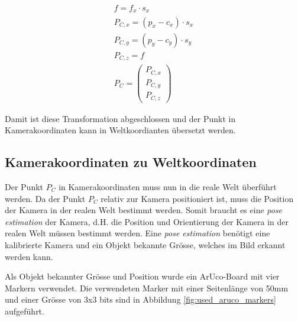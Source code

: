 \begin{align}
f = f_x \cdot s_x\\
P_{C,x} = (p_x - c_x) \cdot s_x\\
P_{C,y} = (p_y - c_y) \cdot s_y\\
P_{C,z} = f\\
P_C = \begin{pmatrix}P_{C,x}\\P_{C,y}\\P_{C,z}\end{pmatrix}
\end{align}


Damit ist diese Transformation abgeschlossen und der Punkt in Kamerakoordinaten kann in Weltkoordianten übersetzt werden.

\subsection{Kamerakoordinaten zu Weltkoordinaten}\label{kap:camera_to_world}

Der Punkt $P_C$ in Kamerakoordinaten muss nun in die reale Welt überführt werden. Da der Punkt $P_C$ relativ zur Kamera
positioniert ist, muss die Position der Kamera in der realen Welt bestimmt werden.
Somit braucht es eine \emph{pose estimation} der Kamera, d.H. die Position und Orientierung der Kamera in der realen Welt müssen bestimmt werden.
Eine \emph{pose estimation} benötigt eine kalibrierte Kamera und ein Objekt bekannte Grösse, welches im Bild erkannt werden kann.

Als Objekt bekannter Grösse und Position wurde ein ArUco-Board \cite{opencv:detection_of_aruco_boards} mit vier Markern verwendet.
Die verwendeten Marker mit einer Seitenlänge von 50\si{\milli\metre} und einer Grösse von 3x3 bits sind
in Abbildung \ref{fig:used_aruco_markers} aufgeführt.

